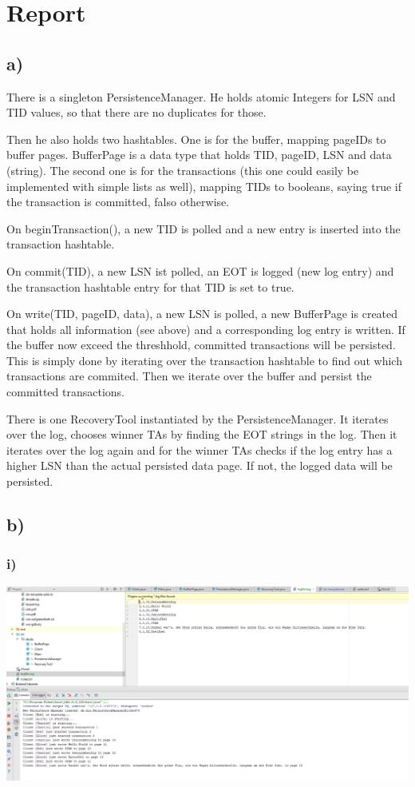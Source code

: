 \documentclass[ngerman]{dis-template-add}
\begin{document}
\section*{Report}

\subsection*{a)}
There is a singleton PersistenceManager.
He holds atomic Integers for LSN and TID values, so that there are no duplicates for those.

Then he also holds two hashtables.
One is for the buffer, mapping pageIDs to buffer pages.
BufferPage is a data type that holds TID, pageID, LSN and data (string).
The second one is for the transactions (this one could easily be implemented with simple lists as well), mapping TIDs to booleans, saying true if the transaction is committed, falso otherwise.

On beginTransaction(), a new TID is polled and a new entry is inserted into the transaction hashtable.

On commit(TID), a new LSN ist polled, an EOT is logged (new log entry) and the transaction hashtable entry for that TID is set to true.

On write(TID, pageID, data), a new LSN is polled, a new BufferPage is created that holds all information (see above) and a corresponding log entry is written.
If the buffer now exceed the threshhold, committed transactions will be persisted.
This is simply done by iterating over the transaction hashtable to find out which transactions are commited.
Then we iterate over the buffer and persist the committed transactions.

\medskip

There is one RecoveryTool instantiated by the PersistenceManager.
It iterates over the log, chooses winner TAs by finding the EOT strings in the log.
Then it iterates over the log again and for the winner TAs checks if the log entry has a higher LSN than the actual persisted data page.
If not, the logged data will be persisted.


\subsection*{b)}
\subsubsection*{i)}

\includegraphics[scale=0.4]{exb.png}
\end{document}
